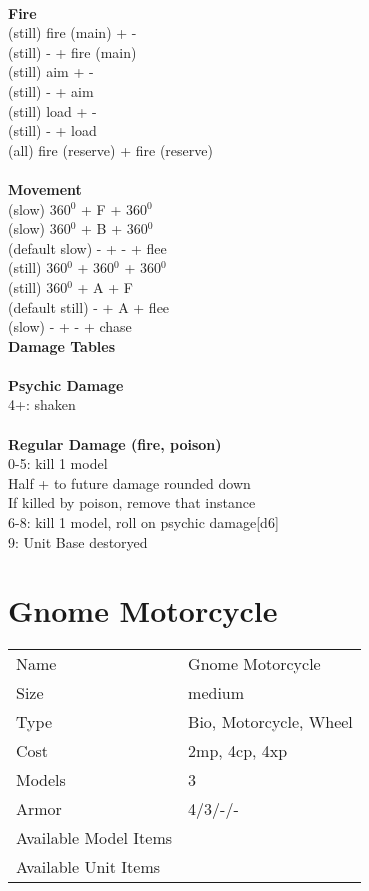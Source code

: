 \ \\ {\bf Fire } \\
(still) fire (main) + - \\
(still) - + fire (main) \\
(still) aim + - \\
(still) - + aim \\
(still) load + - \\
(still) - + load \\
(all) fire (reserve) + fire (reserve) \\
\ \\ {\bf Movement } \\
(slow) 360$^0$ + F + 360$^0$ \\
(slow) 360$^0$ + B + 360$^0$ \\
(default slow) - + - + flee \\
(still) 360$^0$ + 360$^0$ + 360$^0$ \\
(still) 360$^0$ + A + F \\
(default still) - + A + flee \\
(slow) - + - + chase \\



{\bf Damage Tables} \\
\ \\ {\bf Psychic Damage } \\
4+: shaken \\
\ \\ {\bf Regular Damage (fire, poison) } \\
0-5: kill 1 model\\ Half + to future damage rounded down\\If killed by poison, remove that instance \\
6-8: kill 1 model, roll on psychic damage[d6] \\
9: Unit Base destoryed \\









\pagebreak

\section{ Gnome Motorcycle }

\begin{tabular}{ll}
  Name & Gnome Motorcycle \\
  Size & medium\\
  Type & Bio, Motorcycle, Wheel\\
  Cost & 2mp, 4cp, 4xp\\
  Models & 3\\
  Armor & 4/3/-/-\\
  Available Model Items &  \\
  Available Unit Items &  \\
\end{tabular}

